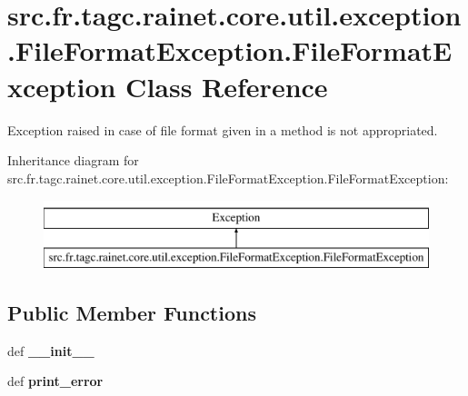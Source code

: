 \hypertarget{classsrc_1_1fr_1_1tagc_1_1rainet_1_1core_1_1util_1_1exception_1_1FileFormatException_1_1FileFormatException}{\section{src.\-fr.\-tagc.\-rainet.\-core.\-util.\-exception.\-File\-Format\-Exception.\-File\-Format\-Exception Class Reference}
\label{classsrc_1_1fr_1_1tagc_1_1rainet_1_1core_1_1util_1_1exception_1_1FileFormatException_1_1FileFormatException}
}


Exception raised in case of file format given in a method is not appropriated.  


Inheritance diagram for src.\-fr.\-tagc.\-rainet.\-core.\-util.\-exception.\-File\-Format\-Exception.\-File\-Format\-Exception\-:\begin{figure}[H]
\begin{center}
\leavevmode
\includegraphics[height=2.000000cm]{classsrc_1_1fr_1_1tagc_1_1rainet_1_1core_1_1util_1_1exception_1_1FileFormatException_1_1FileFormatException}
\end{center}
\end{figure}
\subsection*{Public Member Functions}
\begin{DoxyCompactItemize}
\item 
\hypertarget{classsrc_1_1fr_1_1tagc_1_1rainet_1_1core_1_1util_1_1exception_1_1FileFormatException_1_1FileFormatException_abb3c1d106d1f5434869e7aad4a18aff0}{def {\bfseries \-\_\-\-\_\-init\-\_\-\-\_\-}}\label{classsrc_1_1fr_1_1tagc_1_1rainet_1_1core_1_1util_1_1exception_1_1FileFormatException_1_1FileFormatException_abb3c1d106d1f5434869e7aad4a18aff0}

\item 
\hypertarget{classsrc_1_1fr_1_1tagc_1_1rainet_1_1core_1_1util_1_1exception_1_1FileFormatException_1_1FileFormatException_a32abe45d4867ca201346d1dd3a4e69ba}{def {\bfseries print\-\_\-error}}\label{classsrc_1_1fr_1_1tagc_1_1rainet_1_1core_1_1util_1_1exception_1_1FileFormatException_1_1FileFormatException_a32abe45d4867ca201346d1dd3a4e69ba}

\end{DoxyCompactItemize}
